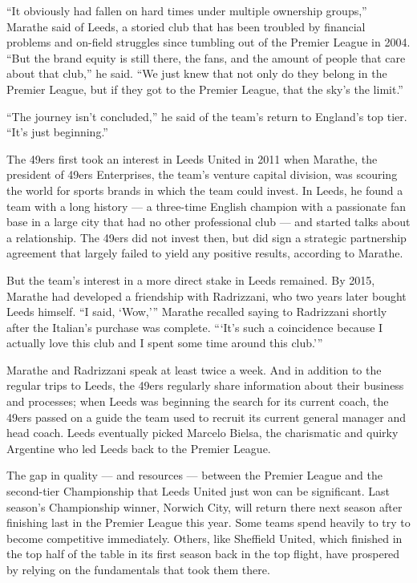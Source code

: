 ``It obviously had fallen on hard times under multiple ownership
groups,'' Marathe said of Leeds, a storied club that has been troubled
by financial problems and on-field struggles since tumbling out of the
Premier League in 2004. ``But the brand equity is still there, the fans,
and the amount of people that care about that club,'' he said. ``We just
knew that not only do they belong in the Premier League, but if they got
to the Premier League, that the sky's the limit.''

``The journey isn't concluded,'' he said of the team's return to
England's top tier. ``It's just beginning.''

The 49ers first took an interest in Leeds United in 2011 when Marathe,
the president of 49ers Enterprises, the team's venture capital division,
was scouring the world for sports brands in which the team could invest.
In Leeds, he found a team with a long history --- a three-time English
champion with a passionate fan base in a large city that had no other
professional club --- and started talks about a relationship. The 49ers
did not invest then, but did sign a strategic partnership agreement that
largely failed to yield any positive results, according to Marathe.

But the team's interest in a more direct stake in Leeds remained. By
2015, Marathe had developed a friendship with Radrizzani, who two years
later bought Leeds himself. ``I said, `Wow,''' Marathe recalled saying
to Radrizzani shortly after the Italian's purchase was complete. ```It's
such a coincidence because I actually love this club and I spent some
time around this club.'''

Marathe and Radrizzani speak at least twice a week. And in addition to
the regular trips to Leeds, the 49ers regularly share information about
their business and processes; when Leeds was beginning the search for
its current coach, the 49ers passed on a guide the team used to recruit
its current general manager and head coach. Leeds eventually picked
Marcelo Bielsa, the charismatic and quirky Argentine who led Leeds back
to the Premier League.

The gap in quality --- and resources --- between the Premier League and
the second-tier Championship that Leeds United just won can be
significant. Last season's Championship winner, Norwich City, will
return there next season after finishing last in the Premier League this
year. Some teams spend heavily to try to become competitive immediately.
Others, like Sheffield United, which finished in the top half of the
table in its first season back in the top flight, have prospered by
relying on the fundamentals that took them there.


